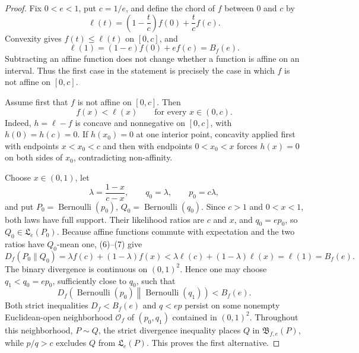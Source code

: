 \documentclass{article}
\begin{document}
\begin{proof}
Fix \(0<e<1\), put \(c=1/e\), and define the chord of \(f\) between \(0\) and \(c\) by
\[
 \ell(t)=\left(1-\frac tc\right)f(0)+\frac tc f(c).
\]
Convexity gives \(f(t)\le\ell(t)\) on \([0,c]\), and
\[
 \ell(1)=(1-e)f(0)+ef(c)=B_f(e). \tag{6}
\]
Subtracting an affine function does not change whether a function is affine on an interval.  Thus the first case in the statement is precisely the case in which \(f\) is not affine on \([0,c]\).

Assume first that \(f\) is not affine on \([0,c]\).  Then
\[
 f(x)<\ell(x)\qquad\text{for every }x\in(0,c). \tag{7}
\]
Indeed, \(h=\ell-f\) is concave and nonnegative on \([0,c]\), with \(h(0)=h(c)=0\).  If \(h(x_0)=0\) at one interior point, concavity applied first with endpoints \(x<x_0<c\) and then with endpoints \(0<x_0<x\) forces \(h(x)=0\) on both sides of \(x_0\), contradicting non-affinity.

Choose \(x\in(0,1)\), let
\[
 \lambda=\frac{1-x}{c-x},\qquad q_0=\lambda,\qquad p_0=c\lambda,
\]
and put \(P_0=\operatorname{Bernoulli}(p_0)\), \(Q_0=\operatorname{Bernoulli}(q_0)\).  Since \(c>1\) and \(0<x<1\), both laws have full support.  Their likelihood ratios are \(c\) and \(x\), and \(q_0=ep_0\), so \(Q_0\in\mathfrak L_e(P_0)\).  Because affine functions commute with expectation and the two ratios have \(Q_0\)-mean one, (6)--(7) give
\[
 D_f(P_0\|Q_0)
 =\lambda f(c)+(1-\lambda)f(x)
 <\lambda\ell(c)+(1-\lambda)\ell(x)
 =\ell(1)=B_f(e). \tag{8}
\]
The binary divergence is continuous on \((0,1)^2\).  Hence one may choose \(q_1<q_0=ep_0\), sufficiently close to \(q_0\), such that
\[
 D_f\!\left(\operatorname{Bernoulli}(p_0)\middle\|\operatorname{Bernoulli}(q_1)\right)<B_f(e).
\]
Both strict inequalities \(D_f<B_f(e)\) and \(q<ep\) persist on some nonempty Euclidean-open neighborhood \(\mathcal O_f\) of \((p_0,q_1)\) contained in \((0,1)^2\).  Throughout this neighborhood, \(P\sim Q\), the strict divergence inequality places \(Q\) in \(\mathfrak B_{f,e}(P)\), while \(p/q>c\) excludes \(Q\) from \(\mathfrak L_e(P)\).  This proves the first alternative.


\end{proof}
\end{document}
